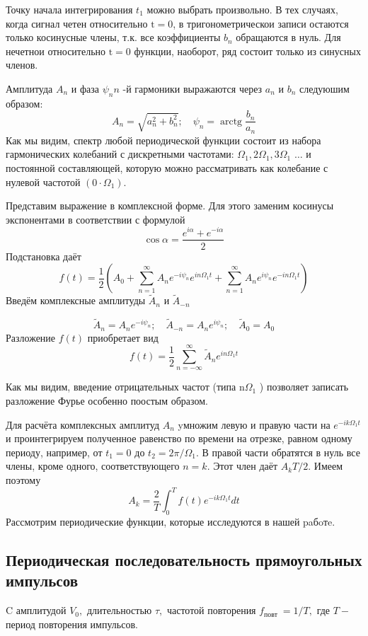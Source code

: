 \documentclass[a4paper, 12pt]{article}%
\begin{document}
Точку начала интегрирования $t_{1}$ можно выбрать произвольно. В тех случаях, когда сигнал четен относительно $\mathrm{t}=0$, в тригонометрическои записи остаются только косинусные члены, т.к. все коэффициенты $b_{n}$ обращаются в нуль. Для нечетнои относительно $\mathrm{t}=0$ функции, наоборот, ряд состоит только из синусных членов.

Амплитуда $A_{n}$ и фаза $\psi_{n} n$ -й гармоники выражаются через $a_{n}$ и $b_{n}$ следуюшим образом:
$$
A_{n}=\sqrt{a_{n}^{2}+b_{n}^{2}} ; \quad \psi_{n}=\operatorname{arctg} \frac{b_{n}}{a_{n}}
$$
Как мы видим, спектр любой периодической функции состоит из набора гармонических колебаний с дискретными частотами: $\Omega_{1}, 2 \Omega_{1}, 3 \Omega_{1}$ $\ldots$ и постоянной составляющей, которую можно рассматривать как колебание с нулевой частотой $\left(0 \cdot \Omega_{1}\right) .$

Представим выражение в комплексной форме. Для этого заменим косинусы экспонентами в соответствии с формулой
$$
\cos \alpha=\frac{e^{i \alpha}+e^{-i \alpha}}{2}
$$
Подстановка даёт
$$
f(t)=\frac{1}{2}\left(A_{0}+\sum_{n=1}^{\infty} A_{n} e^{-i \psi_{n}} e^{i n \Omega_{1} t}+\sum_{n=1}^{\infty} A_{n} e^{i \psi_{n}} e^{-i n \Omega_{1} t}\right)
$$
Введём комплексные амплитуды $\tilde{A}_{n}$ и $\tilde{A}_{-n}$

$$
\tilde{A}_{n}=A_{n} e^{-i \psi_{n}} ; \quad \tilde{A}_{-n}=A_{n} e^{i \psi_{n}} ; \quad \tilde{A}_{0}=A_{0}
$$
Разложение $f(t)$ приобретает вид
$$
f(t)=\frac{1}{2} \sum_{n=-\infty}^{\infty} \tilde{A}_{n} e^{i n \Omega_{1} t}
$$

Как мы видим, введение отрицательных частот (типа $\mathrm{n} \Omega_{1}$ ) позволяет записать разложение Фурье особенно поостым образом.

Для расчёта комплексных амплитуд $A_{n}$ yмножим левую и правую части на $e^{-i k \Omega_{1} t}$ и проинтегрируем полученное равенство по времени на отрезке, равном одному периоду, например, от $t_{1}=0$ до $t_{2}=2 \pi / \Omega_{1} .$ В правой части обратятся в нуль все члены, кроме одного, соответствующего $n=k .$ Этот член даёт $A_{k} T / 2 .$ Имеем поэтому
$$
A_{k}=\frac{2}{T} \int_{0}^{T} f(t) e^{-i k \Omega_{1} t} d t
$$
Рассмотрим периодические функции, которые исследуются в нашей paбoтe.


\subsection{Периодическая последовательность прямоугольных импульсов}
C амплитудой $V_{0},$ длительностью $\tau,$ частотой повторения $f_{\text {повт }}=1 / T,$ где $T-$ период повторения импульсов.
\end{document}
